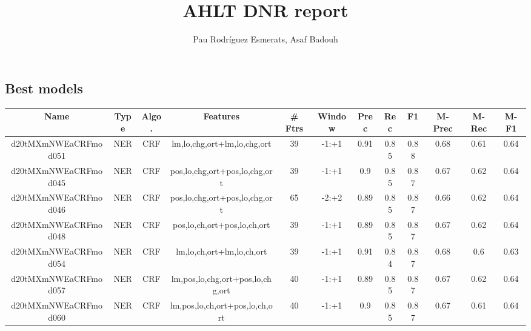 \documentclass[a4paper]{article}
\title{AHLT DNR report}
\author{Pau Rodríguez Esmerats, Asaf Badouh }
\begin{document}
\begin{landscape}

\section{ Best models}
\begin{center}
\begin{tabular}{ |c|c|c|c|c|c|c|c|c|c|c|c|} 
 \hline
 	Name & Type & Algo. & Features & \# Ftrs & Window & Prec & Rec & F1 & M-Prec & M-Rec & M-F1\\
 \hline
 
 	
 		
 		\small{ d20tMXmNWEaCRFmod051 } & NER & CRF & lm,lo,chg,ort+lm,lo,chg,ort  &  39 &  -1:+1  &  0.91 & 0.85 & 0.88  &  0.68 & 0.61 & 0.64 \\
 		

 	
 
 	
 		
 		\small{ d20tMXmNWEaCRFmod045 } & NER & CRF & pos,lo,chg,ort+pos,lo,chg,ort  &  39 &  -1:+1  &  0.9 & 0.85 & 0.87  &  0.67 & 0.62 & 0.64 \\
 		

 	
 
 	
 		
 		\small{ d20tMXmNWEaCRFmod046 } & NER & CRF & pos,lo,chg,ort+pos,lo,chg,ort  &  65 &  -2:+2  &  0.89 & 0.85 & 0.87  &  0.66 & 0.62 & 0.64 \\
 		

 	
 
 	
 		
 		\small{ d20tMXmNWEaCRFmod048 } & NER & CRF & pos,lo,ch,ort+pos,lo,ch,ort  &  39 &  -1:+1  &  0.89 & 0.85 & 0.87  &  0.67 & 0.62 & 0.64 \\
 		

 	
 
 	
 		
 		\small{ d20tMXmNWEaCRFmod054 } & NER & CRF & lm,lo,ch,ort+lm,lo,ch,ort  &  39 &  -1:+1  &  0.91 & 0.84 & 0.87  &  0.68 & 0.6 & 0.63 \\
 		

 	
 
 	
 		
 		\small{ d20tMXmNWEaCRFmod057 } & NER & CRF & lm,pos,lo,chg,ort+pos,lo,chg,ort  &  40 &  -1:+1  &  0.89 & 0.85 & 0.87  &  0.67 & 0.62 & 0.64 \\
 		

 	
 
 	
 		
 		\small{ d20tMXmNWEaCRFmod060 } & NER & CRF & lm,pos,lo,ch,ort+pos,lo,ch,ort  &  40 &  -1:+1  &  0.9 & 0.85 & 0.87  &  0.67 & 0.61 & 0.64 \\
 		


\end{tabular}
\end{center}
\end{landscape}
\end{document}

